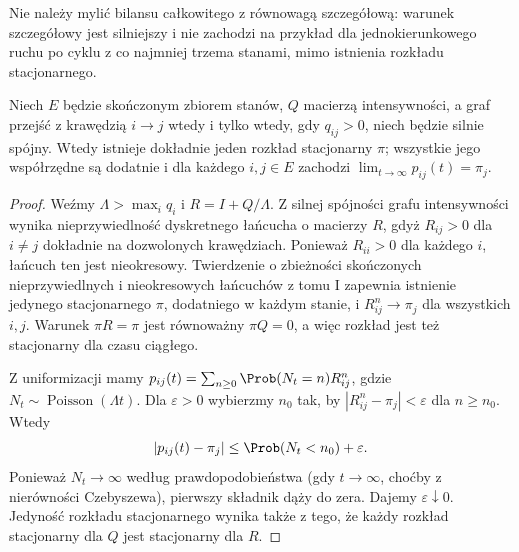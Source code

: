 Nie należy mylić bilansu całkowitego z równowagą szczegółową:
warunek szczegółowy jest silniejszy i nie zachodzi na przykład
dla jednokierunkowego ruchu po cyklu z co najmniej trzema
stanami, mimo istnienia rozkładu stacjonarnego.

\begin{twierdzenie}
Niech $E$ będzie skończonym zbiorem stanów, $Q$ macierzą
intensywności, a graf przejść z krawędzią $i\to j$ wtedy
i tylko wtedy, gdy $q_{ij}>0$, niech będzie silnie spójny.
Wtedy istnieje dokładnie jeden rozkład stacjonarny $\pi$;
wszystkie jego współrzędne są dodatnie i dla każdego
$i,j\in E$ zachodzi
$\lim_{t\to\infty}p_{ij}(t)=\pi_j$.
\end{twierdzenie}
\begin{proof}
Weźmy $\Lambda>\max_i q_i$ i $R=I+Q/\Lambda$.
Z silnej spójności grafu intensywności wynika
nieprzywiedlność dyskretnego łańcucha o macierzy $R$,
gdyż $R_{ij}>0$ dla $i\ne j$ dokładnie na dozwolonych
krawędziach. Ponieważ $R_{ii}>0$ dla każdego $i$,
łańcuch ten jest nieokresowy.
Twierdzenie o zbieżności skończonych nieprzywiedlnych
i nieokresowych łańcuchów z tomu I zapewnia istnienie
jedynego stacjonarnego $\pi$, dodatniego w każdym stanie,
i $R^n_{ij}\to\pi_j$ dla wszystkich $i,j$.
Warunek $\pi R=\pi$ jest równoważny $\pi Q=0$,
a więc rozkład jest też stacjonarny dla czasu ciągłego.

Z uniformizacji mamy
$p_{ij}(t)=\sum_{n\ge0}\Prob(N_t=n)R^n_{ij}$,
gdzie $N_t\sim\operatorname{Poisson}(\Lambda t)$.
Dla $\varepsilon>0$ wybierzmy $n_0$ tak, by
$|R^n_{ij}-\pi_j|<\varepsilon$ dla $n\ge n_0$.
Wtedy
\[
|p_{ij}(t)-\pi_j|
\le\Prob(N_t<n_0)+\varepsilon.
\]
Ponieważ $N_t\to\infty$ według prawdopodobieństwa
(gdy $t\to\infty$, choćby z nierówności Czebyszewa),
pierwszy składnik dąży do zera. Dajemy $\varepsilon\downarrow0$.
Jedyność rozkładu stacjonarnego wynika także z tego,
że każdy rozkład stacjonarny dla $Q$ jest stacjonarny dla $R$.
\end{proof}

